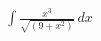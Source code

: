 \documentclass[preview]{standalone}
\begin{document}
\begin{align*}
\int \frac{x^3}{\sqrt{(9+x^2)}} \, dx
\end{align*}
\end{document}
